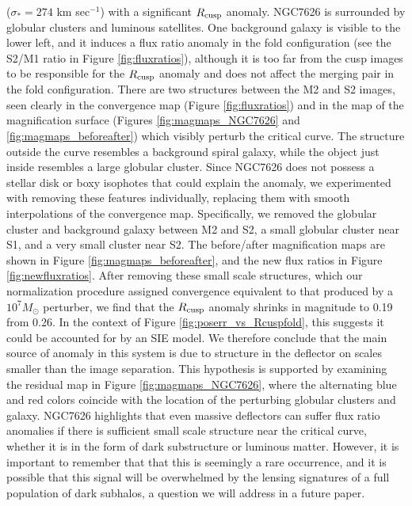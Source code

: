 \begin{itemize}
	($\sigma_* = 274$ km sec$^{-1}$) with a significant $R_{\rm{cusp}}$ anomaly. NGC7626 is surrounded by globular clusters and luminous satellites. One background galaxy is visible to the lower left, and it induces a flux ratio anomaly in the fold configuration (see the S2/M1 ratio in Figure \ref{fig:fluxratios}), although it is too far from the cusp images to be responsible for the $R_{\rm{cusp}}$ anomaly and does not affect the merging pair in the fold configuration. There are two structures between the M2 and S2 images, seen clearly in the convergence map (Figure \ref{fig:fluxratios}) and in the map of the magnification surface (Figures \ref{fig:magmaps_NGC7626} and \ref{fig:magmaps_beforeafter}) which visibly perturb the critical curve. The structure outside the curve resembles a background spiral galaxy, while the object just inside resembles a large globular cluster. Since NGC7626 does not possess a stellar disk or boxy isophotes that could explain the anomaly, we experimented with removing these features individually, replacing them with smooth interpolations of the convergence map. Specifically, we removed the globular cluster and background galaxy between M2 and S2, a small globular cluster near S1, and a very small cluster near S2. The before/after magnification maps are shown in Figure \ref{fig:magmaps_beforeafter}, and the new flux ratios in Figure \ref{fig:newfluxratios}. After removing these small scale structures, which our normalization procedure assigned convergence equivalent to that produced by a $10^7 M_{\odot}$ perturber, we find that the $R_{\rm{cusp}}$ anomaly shrinks in magnitude to 0.19 from 0.26. In the context of Figure \ref{fig:poserr_vs_Rcuspfold}, this suggests it could be accounted for by an SIE model. We therefore conclude that the main source of anomaly in this system is due to structure in the deflector on scales smaller than the image separation. This hypothesis is supported by examining the residual map in Figure \ref{fig:magmaps_NGC7626}, where the alternating blue and red colors coincide with the location of the perturbing globular clusters and galaxy. NGC7626 highlights that even massive deflectors can suffer flux ratio anomalies if there is sufficient small scale structure near the critical curve, whether it is in the form of dark substructure or luminous matter. However, it is important to remember that that this is seemingly a rare occurrence, and it is possible that this signal will be overwhelmed by the lensing signatures of a full population of dark subhalos, a question we will address in a future paper. 
	

\end{itemize}
